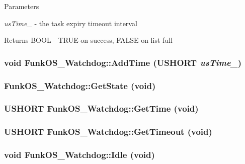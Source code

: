 \begin{DoxyParams}{Parameters}
\item[{\em usTime\_\-}]-\/ the task expiry timeout interval \end{DoxyParams}
\begin{DoxyReturn}{Returns}
BOOL -\/ TRUE on success, FALSE on list full 
\end{DoxyReturn}
\subsubsection[{AddTime}]{\setlength{\rightskip}{0pt plus 5cm}void FunkOS\_\-Watchdog::AddTime (USHORT {\em usTime\_\-})}\label{class_funk_o_s___watchdog_a184fd7c688b8f7654fc7c25debe9c689}
\subsubsection[{GetState}]{ FunkOS\_\-Watchdog::GetState (void)}\label{class_funk_o_s___watchdog_a9e92411a100bb73772cbd708895145f1}
\subsubsection[{GetTime}]{\setlength{\rightskip}{0pt plus 5cm}USHORT FunkOS\_\-Watchdog::GetTime (void)}\label{class_funk_o_s___watchdog_a0188b7d0c17a63337ef6b486653b9a25}
\subsubsection[{GetTimeout}]{\setlength{\rightskip}{0pt plus 5cm}USHORT FunkOS\_\-Watchdog::GetTimeout (void)}\label{class_funk_o_s___watchdog_a2e99f969f111816312b34286e7706285}
\subsubsection[{Idle}]{\setlength{\rightskip}{0pt plus 5cm}void FunkOS\_\-Watchdog::Idle (void)}\label{class_funk_o_s___watchdog_af6aa2c0464226d02ff0ad1b87569c967}
